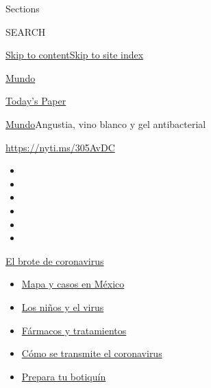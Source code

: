 Sections

SEARCH

\protect\hyperlink{site-content}{Skip to
content}\protect\hyperlink{site-index}{Skip to site index}

\href{https://www.nytimes.com/es/section/mundo}{Mundo}

\href{https://myaccount.nytimes.com/auth/login?response_type=cookie\&client_id=vi}{}

\href{https://www.nytimes.com/section/todayspaper}{Today's Paper}

\href{/es/section/mundo}{Mundo}\textbar{}Angustia, vino blanco y gel
antibacterial

\url{https://nyti.ms/305AvDC}

\begin{itemize}
\item
\item
\item
\item
\item
\item
\end{itemize}

\href{https://www.nytimes.com/es/spotlight/coronavirus?action=click\&pgtype=Article\&state=default\&region=TOP_BANNER\&context=storylines_menu}{El
brote de coronavirus}

\begin{itemize}
\tightlist
\item
  \href{https://www.nytimes.com/es/interactive/2020/espanol/america-latina/coronavirus-en-mexico.html?action=click\&pgtype=Article\&state=default\&region=TOP_BANNER\&context=storylines_menu}{Mapa
  y casos en México}
\item
  \href{https://www.nytimes.com/es/2020/07/31/espanol/ciencia-y-tecnologia/ninos-contagio-coronavirus.html?action=click\&pgtype=Article\&state=default\&region=TOP_BANNER\&context=storylines_menu}{Los
  niños y el virus}
\item
  \href{https://www.nytimes.com/es/interactive/2020/science/coronavirus-tratamientos-curas.html?action=click\&pgtype=Article\&state=default\&region=TOP_BANNER\&context=storylines_menu}{Fármacos
  y tratamientos}
\item
  \href{https://www.nytimes.com/es/2020/07/06/espanol/ciencia-y-tecnologia/coronavirus-transmision-aire.html?action=click\&pgtype=Article\&state=default\&region=TOP_BANNER\&context=storylines_menu}{Cómo
  se transmite el coronavirus}
\item
  \href{https://www.nytimes.com/es/2020/07/14/espanol/estilos-de-vida/botiquin-medicina-coronavirus.html?action=click\&pgtype=Article\&state=default\&region=TOP_BANNER\&context=storylines_menu}{Prepara
  tu botiquín}
\end{itemize}

